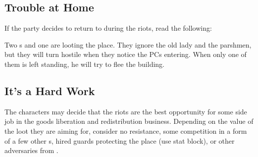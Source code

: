 \subsection{Trouble at Home}

If the party decides to return to \npcGrandma{} during the riots, read the following:


Two \enemyRioter{}s and one \enemyWallGuard{} are looting the place. They ignore the old lady and the parshmen, but they will turn hostile when they notice the PCs entering. When only one of them is left standing, he will try to flee the building.



\subsection{It's a Hard Work}

The characters may decide that the riots are the best opportunity for some side job in the goods liberation and redistribution business. Depending on the value of the loot they are aiming for, consider no resistance, some competition in a form of a few other \enemyRioter{}s, hired guards protecting the place (use \enemyWallGuard{} stat block), or other adversaries from \bookWorldGuide{}.

